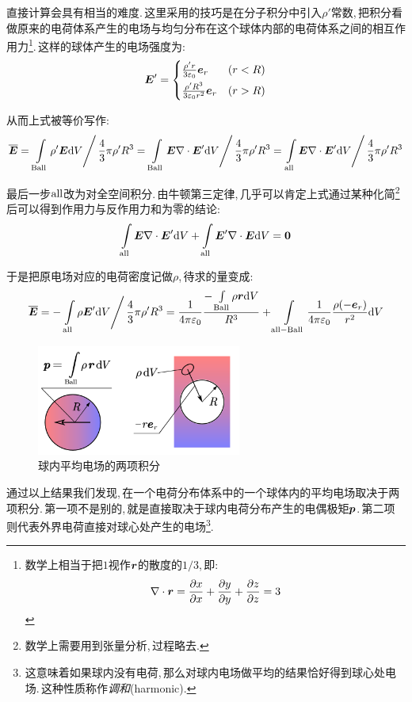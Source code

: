 直接计算会具有相当的难度.\,这里采用的技巧是在分子积分中引入$\rho'$常数,\,把积分看做原来的电荷体系产生的电场与均匀分布在这个球体内部的电荷体系之间的相互作用力\footnote{数学上相当于把$1$视作$\boldsymbol{r}$的散度的$1/3$,\,即:
\[\nabla\cdot \boldsymbol{r}=\frac{\partial x}{\partial x}+\frac{\partial y}{\partial y}+\frac{\partial z}{\partial z}=3\]
}.\,这样的球体产生的电场强度为:
\[\boldsymbol{E}'=\begin{cases} \frac{\rho' r}{3\varepsilon_0}\boldsymbol{e}_r & (r<R)\\[4pt] \frac{\rho' R^3}{3\varepsilon_0 r^2}\boldsymbol{e}_r & (r>R) \end{cases}\]

从而上式被等价写作:
\[\overline{\boldsymbol{E}}=\left.\int\limits_{\rm Ball}\rho' \boldsymbol{E} \textrm{d} V\right/ \frac{4}{3}\pi \rho' R^3=\left.\int\limits_{\rm Ball} \boldsymbol{E}\nabla\cdot\boldsymbol{E}'  \textrm{d} V\right/ \frac{4}{3}\pi \rho' R^3=\left.\int\limits_{\rm all} \boldsymbol{E}\nabla\cdot\boldsymbol{E}'  \textrm{d} V\right/ \frac{4}{3}\pi \rho' R^3\]

最后一步${\rm all}$改为对全空间积分.\,由牛顿第三定律,\,几乎可以肯定上式通过某种化简\footnote{数学上需要用到张量分析,\,过程略去.}后可以得到作用力与反作用力和为零的结论:
\[\int\limits_{\rm all} \boldsymbol{E}\nabla\cdot\boldsymbol{E}'  \textrm{d} V+\int\limits_{\rm all} \boldsymbol{E}'\nabla\cdot\boldsymbol{E}  \textrm{d} V=\boldsymbol{0}\]

于是把原电场对应的电荷密度记做$\rho$,\,待求的量变成:
\[\overline{\boldsymbol{E}}=-\left.\int\limits_{\rm all}\rho \boldsymbol{E}' \textrm{d} V\right/ \frac{4}{3}\pi \rho' R^3=\frac{1}{4\pi\varepsilon_0}\frac{-\int\limits_{\rm Ball}\rho \boldsymbol{r}\textrm{d} V}{R^3}+\int\limits_{\rm all-Ball}\frac{1}{4\pi\varepsilon_0}\frac{\rho(-\boldsymbol{e}_r)}{r^2}\textrm{d} V\]

\begin{figure}[H]
\centering
\includegraphics[width=0.6\textwidth]{image/7-1-17.png}
\caption{球内平均电场的两项积分}
\end{figure}

通过以上结果我们发现,\,在一个电荷分布体系中的一个球体内的平均电场取决于两项积分.\,第一项不是别的,\,就是直接取决于球内电荷分布产生的电偶极矩$\boldsymbol{p}$.\,第二项则代表外界电荷直接对球心处产生的电场\footnote{这意味着如果球内没有电荷,\,那么对球内电场做平均的结果恰好得到球心处电场.\,这种性质称作\emph{调和}(harmonic).}.

